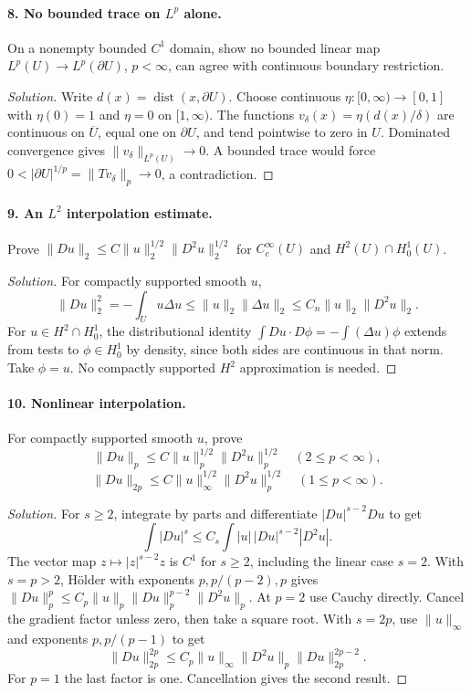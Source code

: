 \paragraph{8. No bounded trace on $L^p$ alone.}
On a nonempty bounded $C^1$ domain, show no bounded linear map
$L^p(U)\to L^p(\partial U)$, $p<\infty$, can agree with continuous
boundary restriction.
\begin{proof}[Solution]
Write $d(x)=\operatorname{dist}(x,\partial U)$.
Choose continuous $\eta:[0,\infty)\to[0,1]$ with $\eta(0)=1$ and
$\eta=0$ on $[1,\infty)$. The functions
$v_\delta(x)=\eta(d(x)/\delta)$ are continuous on $\overline U$,
equal one on $\partial U$, and tend pointwise to zero in $U$.
Dominated convergence gives $\|v_\delta\|_{L^p(U)}\to0$.
A bounded trace would force
$0<|\partial U|^{1/p}=\|Tv_\delta\|_p\to0$, a contradiction.
\end{proof}
\Needspace{45mm}

\paragraph{9. An $L^2$ interpolation estimate.}
Prove $\|Du\|_2\leq C\|u\|_2^{1/2}\|D^2u\|_2^{1/2}$ for
$C_c^\infty(U)$ and $H^2(U)\cap H^1_0(U)$.
\begin{proof}[Solution]
For compactly supported smooth $u$,
\[
 \|Du\|_2^2=-\int_Uu\Delta u
 \leq\|u\|_2\|\Delta u\|_2
 \leq C_n\|u\|_2\|D^2u\|_2.
\]
For $u\in H^2\cap H^1_0$, the distributional identity
$\int Du\cdot D\phi=-\int(\Delta u)\phi$ extends from tests to
$\phi\in H^1_0$ by density, since both sides are continuous in that
norm. Take $\phi=u$. No compactly supported $H^2$ approximation
is needed.
\end{proof}
\Needspace{45mm}

\paragraph{10. Nonlinear interpolation.}
For compactly supported smooth $u$, prove
\[
 \|Du\|_p\leq C\|u\|_p^{1/2}\|D^2u\|_p^{1/2}\quad(2\leq p<\infty),
\]
\[
 \|Du\|_{2p}\leq C\|u\|_\infty^{1/2}\|D^2u\|_p^{1/2}
 \quad(1\leq p<\infty).
\]
\begin{proof}[Solution]
For $s\geq2$, integrate by parts and differentiate
$|Du|^{s-2}Du$ to get
\[
 \int|Du|^s\leq C_s\int|u|\,|Du|^{s-2}|D^2u|.
\]
The vector map $z\mapsto|z|^{s-2}z$ is $C^1$ for $s\geq2$,
including the linear case $s=2$.
With $s=p>2$, H\"older with exponents $p,p/(p-2),p$ gives
$\|Du\|_p^p\leq C_p\|u\|_p\|Du\|_p^{p-2}\|D^2u\|_p$.
At $p=2$ use Cauchy directly. Cancel the gradient factor unless zero,
then take a square root.
With $s=2p$, use $\|u\|_\infty$ and exponents $p,p/(p-1)$ to get
\[
 \|Du\|_{2p}^{2p}
 \leq C_p\|u\|_\infty\|D^2u\|_p\|Du\|_{2p}^{2p-2}.
\]
For $p=1$ the last factor is one. Cancellation gives the second result.
\end{proof}

